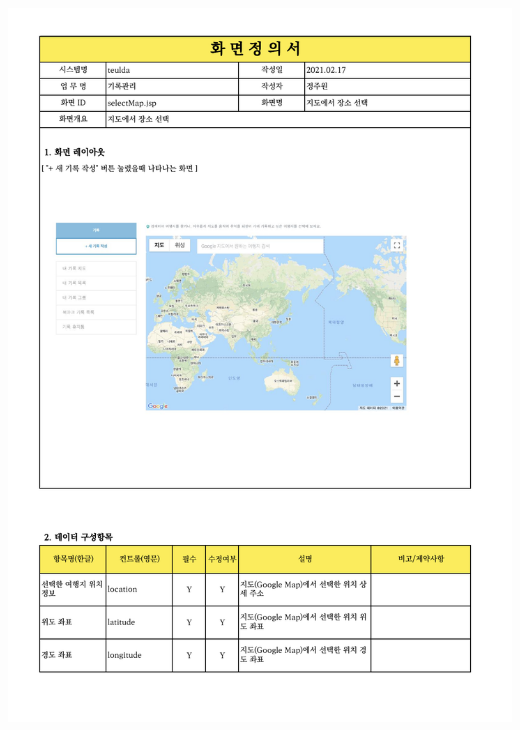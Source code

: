 {{{{{{{{{{{{{{{{{{{\includegraphics[width=20cm]{./Figure/Design/Display/diary/diary_01.pdf} \\
}}}}}}}}}}}}}}}}}}}

